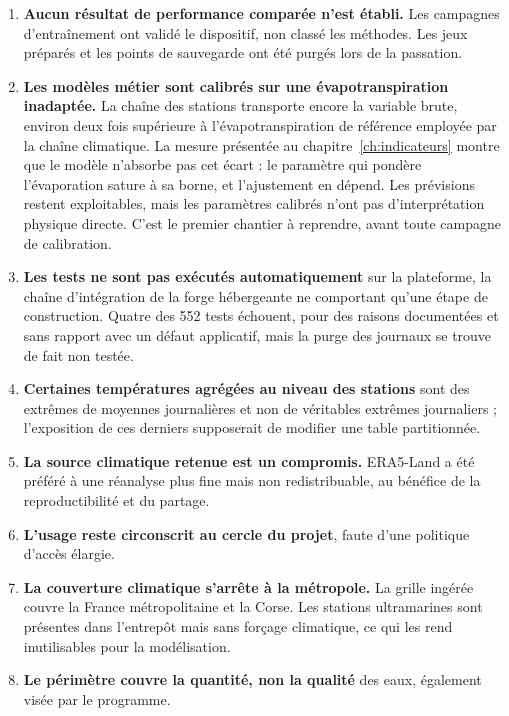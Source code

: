 \begin{enumerate}
  \item \textbf{Aucun résultat de performance comparée n'est établi.} Les campagnes
  d'entraînement ont validé le dispositif, non classé les méthodes. Les jeux préparés et les
  points de sauvegarde ont été purgés lors de la passation.

  \item \textbf{Les modèles métier sont calibrés sur une évapotranspiration inadaptée.} La
  chaîne des stations transporte encore la variable brute, environ deux fois supérieure à
  l'évapotranspiration de référence employée par la chaîne climatique. La mesure présentée au
  chapitre~\ref{ch:indicateurs} montre que le modèle n'absorbe pas cet écart : le paramètre qui
  pondère l'évaporation sature à sa borne, et l'ajustement en dépend. Les prévisions restent
  exploitables, mais les paramètres calibrés n'ont pas d'interprétation physique directe. C'est
  le premier chantier à reprendre, avant toute campagne de calibration.

  \item \textbf{Les tests ne sont pas exécutés automatiquement} sur la plateforme, la chaîne
  d'intégration de la forge hébergeante ne comportant qu'une étape de construction. Quatre des
  \num{552} tests échouent, pour des raisons documentées et sans rapport avec un défaut
  applicatif, mais la purge des journaux se trouve de fait non testée.

  \item \textbf{Certaines températures agrégées au niveau des stations} sont des extrêmes de
  moyennes journalières et non de véritables extrêmes journaliers ; l'exposition de ces derniers
  supposerait de modifier une table partitionnée.

  \item \textbf{La source climatique retenue est un compromis.} ERA5-Land a été préféré à une
  réanalyse plus fine mais non redistribuable, au bénéfice de la reproductibilité et du partage.

  \item \textbf{L'usage reste circonscrit au cercle du projet}, faute d'une politique d'accès
  élargie.

  \item \textbf{La couverture climatique s'arrête à la métropole.} La grille ingérée couvre la
  France métropolitaine et la Corse. Les stations ultramarines sont présentes dans l'entrepôt
  mais sans forçage climatique, ce qui les rend inutilisables pour la modélisation.

  \item \textbf{Le périmètre couvre la quantité, non la qualité} des eaux, également visée par
  le programme.
\end{enumerate}

